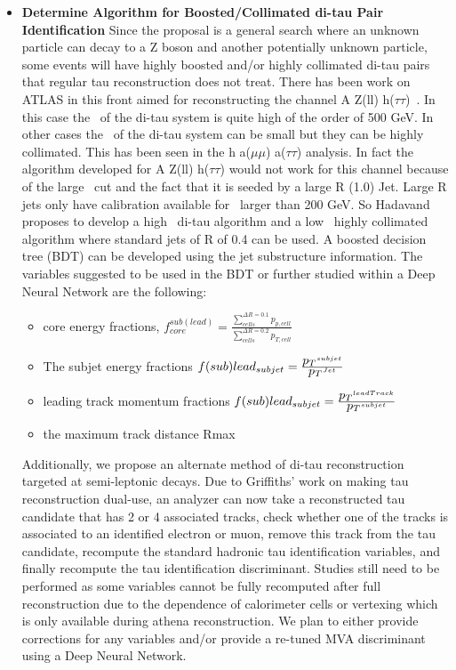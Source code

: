 \begin{itemize}[noitemsep,nolistsep,leftmargin=*]
\item[]{{\bf Determine Algorithm for Boosted/Collimated di-tau Pair Identification} %
Since the proposal is a general search where an unknown particle can decay to a Z boson and another potentially unknown particle, some events will have highly boosted and/or highly collimated di-tau pairs that regular
tau reconstruction does not treat.  There has been work on ATLAS in this front aimed for reconstructing the channel A \too Z(ll) h($\tau\tau$)~\cite{di-tau-thesis}.  In this case the \pt\ of the di-tau system is quite high of the order of 500 GeV.
In other cases the \pt\ of the di-tau system can be small but they can be highly collimated.  This has been seen in the h \too a($\mu \mu$) a($\tau \tau$) analysis.  In fact the algorithm developed for A \too Z(ll) h($\tau\tau$) would not 
work for this channel because of the large \pt\ cut and the fact that it is seeded by a large R (1.0) Jet.  Large R jets only have calibration available for \pt\ larger than 200 GeV.  So Hadavand proposes to develop a high \pt\ di-tau
algorithm and a low \pt\ highly collimated algorithm where standard jets of R of 0.4 can be used. A boosted decision tree (BDT) can be developed using the jet substructure information.  
The variables suggested to be used in the BDT or further studied within a Deep Neural Network are the following:
\begin{itemize}
\item{core energy fractions, $f_{core}^{sub(lead)}=\frac{\sum_{cells}^{\Delta R=0.1} p_{p,cell}}{\sum_{cells}^{\Delta R=0.2}p_{T,cell}} $}
\item{The subjet energy fractions $f(sub)lead_{subjet}=\frac{\mbox{$p_T$} ^{subjet}}{\mbox{$p_T$} ^{Jet}}$}
\item{leading track momentum fractions $f(sub)lead_{subjet}=\frac{\mbox{$p_T$} ^{leadTrack}}{\mbox{$p_T$} ^{subjet}}$}
\item{the maximum track distance Rmax}
\end{itemize}
Additionally, we propose an alternate method of di-tau reconstruction targeted at semi-leptonic decays.  Due to Griffiths' work on making tau reconstruction dual-use, an analyzer
can now take a reconstructed tau candidate that has 2 or 4 associated tracks, check whether one of the tracks is associated to an identified electron or muon, remove this
track from the tau candidate, recompute the standard hadronic tau identification variables, and finally recompute the tau identification discriminant.  Studies still need
to be performed as some variables cannot be fully recomputed after full reconstruction due to the dependence of calorimeter cells or vertexing which is only available during 
athena reconstruction.  We plan to either provide corrections for any variables and/or provide a re-tuned MVA discriminant using a Deep Neural Network.}


\end{itemize}
